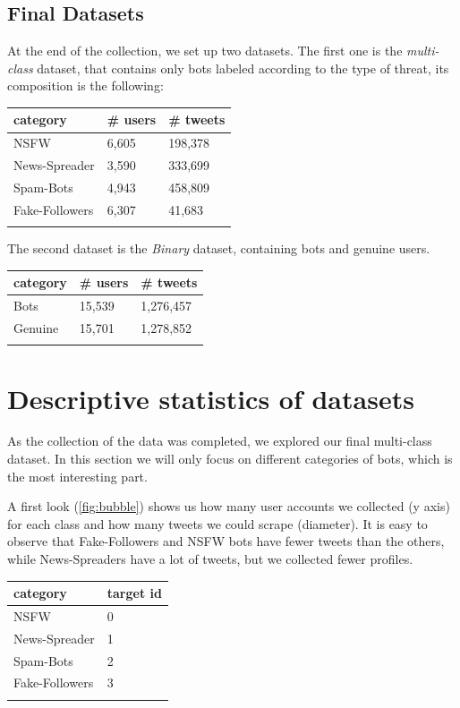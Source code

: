 \subsection{Final Datasets}
\label{sec:dataset}
At the end of the collection, we set up two datasets. The first one is the \textit{multi-class} dataset, that contains only bots labeled according to the type of threat, its composition is the following:

\begin{center}
\begin{tabular}{lll}
	\\category&\# users&\# tweets\\
	\hline\hline
	NSFW&6,605&198,378\\
	News-Spreader&3,590&333,699\\
	Spam-Bots&4,943&458,809\\
	Fake-Followers&6,307&41,683\\\hline\\	
\end{tabular}
\end{center}

The second dataset is the \textit{Binary} dataset, containing bots and genuine users.

\begin{center}
	\begin{tabular}{lll}
		\\category&\# users&\# tweets\\
		\hline\hline
		Bots&15,539&1,276,457\\
		Genuine&15,701&1,278,852\\\hline\\	
	\end{tabular}
\end{center}

\newpage
\section{Descriptive statistics of datasets}
As the collection of the data was completed, we explored our final multi-class dataset. In this section we will only focus on different categories of bots, which is the most interesting part.

A first look (\ref{fig:bubble}) shows us how many user accounts we collected (y axis) for each class and how many tweets we could scrape (diameter). It is easy to observe that Fake-Followers and NSFW bots have fewer tweets than the others, while News-Spreaders have a lot of tweets, but we collected fewer profiles.
\begin{center}
	\begin{tabular}{ll}
		\\category&target id\\
		\hline\hline
		NSFW&0\\
		News-Spreader&1\\
		Spam-Bots&2\\
		Fake-Followers&3\\\hline\\		
	\end{tabular}
\end{center}


